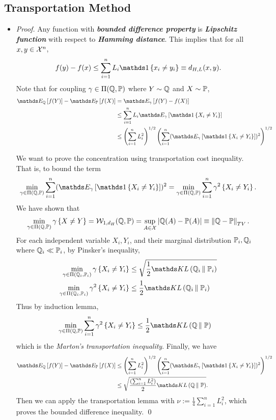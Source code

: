 \documentclass[11pt]{article}
\begin{document}
\subsection{Transportation Method}
\begin{itemize}
\item \begin{proof}
Any  function with \emph{\textbf{bounded difference property}} is \emph{\textbf{Lipschitz function}} with respect to \emph{\textbf{Hamming distance}}. This implies that for all $x, y \in {\mathcal X}^n$,
\begin{align*}
f(y) - f(x) \le \sum_{i=1}^{n}L_i \ind{x_i \neq y_i} \equiv d_{H,L}(x, y).
\end{align*} Note that for coupling $\gamma \in \Pi({\mathbb Q}, {\mathbb P})$ where $Y \sim {\mathbb Q}$ and $X \sim {\mathbb P}$, 
\begin{align*}
\E{\bQ}{f(Y)} - \E{\bP}{f(X)} &= \E{\gamma}{f(Y) - f(X)} \\
&\le \sum_{i=1}^n L_i \E{\gamma}{\ind{X_i \neq Y_i}} \\
&\le \paren{\sum_{i=1}^{n}L_i^2}^{1/2}\paren{\sum_{i=1}^{n}(\E{\gamma}{\ind{X_i \neq Y_i}})^2}^{1/2}
\end{align*}

We want to prove the concentration using transportation cost inequality. That is, to bound the term
\begin{align*}
\min_{\gamma \in \Pi(\bQ, \bP)}\sum_{i=1}^{n}(\E{\gamma}{\ind{X_i \neq Y_i}})^2 = \min_{\gamma \in \Pi(\bQ, \bP)}\sum_{i=1}^{n}\gamma^2\set{X_i \neq Y_i}.
\end{align*} We have shown that 
\begin{align*}
\min_{\gamma \in \Pi({\mathbb Q}, {\mathbb P})}\gamma\left\{X \neq Y\right\} = {\mathcal W}_{1, d_H}({\mathbb Q}, {\mathbb P}) = \sup_{A \in {\mathcal X}}\left\lvert {\mathbb Q}(A) - {\mathbb P}(A) \right\rvert  \equiv \left\|{\mathbb Q} - {\mathbb P}\right\|_{TV}.
\end{align*}  For each independent variable $X_i, Y_i$, and their marginal distribution ${\mathbb P}_i, {\mathbb Q}_i$ where ${\mathbb Q}_i \ll {\mathbb P}_i$, by Pinsker's inequality,
\begin{align*}
 \min_{\gamma \in \Pi(\bQ_i, \bP_i)}\gamma\set{X_i \neq Y_i}  &\le \sqrt{\frac{1}{2}\kl{\bQ_i}{\bP_i}} \\
 \min_{\gamma \in \Pi(\bQ_i, \bP_i)}\gamma^2\set{X_i \neq Y_i} &\le \frac{1}{2}\kl{\bQ_i}{\bP_i}
\end{align*} Thus by induction lemma, 
\begin{align*}
\min_{\gamma \in \Pi(\bQ, \bP)}\sum_{i=1}^{n}\gamma^2\set{X_i \neq Y_i} &\le \frac{1}{2}\kl{\bQ}{\bP}
\end{align*} which is the \emph{Marton's transportation inequality}. Finally, we have
\begin{align*}
\E{\bQ}{f(Y)} - \E{\bP}{f(X)} &\le \paren{\sum_{i=1}^{n}L_i^2}^{1/2}\paren{\sum_{i=1}^{n}(\E{\gamma}{\ind{X_i \neq Y_i}})^2}^{1/2} \\
&\le \sqrt{\frac{\paren{\sum_{i=1}^{n}L_i^2}}{2}\kl{\bQ}{\bP}}.
\end{align*} Then we can apply the transportation lemma with $\nu := \frac{1}{4}\sum_{i=1}^{n}L_i^2$, which proves the bounded difference inequality. \qed 
\end{proof}
\end{itemize}





\newpage


\end{document}
